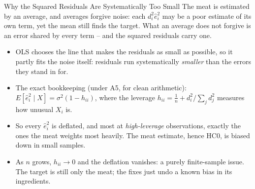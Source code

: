 \documentclass[aspectratio=169,11pt,xcolor=dvipsnames]{beamer}
\newcommand{\E}{E}
\begin{document}
\begin{frame}{Why the Squared Residuals Are Systematically Too Small}
The meat is estimated by an average, and averages forgive noise: each
$d_i^2\hat e_i^2$ may be a poor estimate of its own term, yet the mean still
finds the target. \alert{What an average does not forgive is an error shared
by every term} -- and the squared residuals carry one.
\begin{itemize}\itemsep4pt
  \item OLS chooses the line that makes the residuals as small as possible,
        so it partly fits the noise itself: residuals run systematically
        \emph{smaller} than the errors they stand in for.
  \item The exact bookkeeping (under A5, for clean arithmetic):
        $\E[\hat e_i^2 \mid X] = \sigma^2(1 - h_{ii})$, where the
        \alert{leverage} $h_{ii} = \tfrac1n + d_i^2\big/\sum_j d_j^2$
        measures how unusual $X_i$ is.
  \item So every $\hat e_i^2$ is deflated, and most at \emph{high-leverage}
        observations, exactly the ones the meat weights most heavily. The
        meat estimate, hence HC0, is \alert{biased down in small samples}.
  \item As $n$ grows, $h_{ii} \to 0$ and the deflation vanishes: a purely
        finite-sample issue. The target is still only the meat; the fixes
        just undo a known bias in its ingredients.
\end{itemize}
\end{frame}
\end{document}
